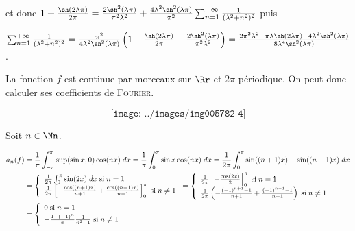 {{et donc $1+\frac{\sh(2\lambda\pi)}{2\pi}=\frac{2\sh^2(\lambda\pi)}{\pi^2\lambda^2}+\frac{4\lambda^2\sh^2(\lambda\pi)}{\pi^2}\sum_{n=1}^{+\infty}\frac{1}{(\lambda^2+n^2)^2}$ puis

\begin{center}
$\sum_{n=1}^{+\infty}\frac{1}{(\lambda^2+n^2)^2}=\frac{\pi^2}{4\lambda^2\sh^2(\lambda\pi)}\left(1+\frac{\sh(2\lambda\pi)}{2\pi}-\frac{2\sh^2(\lambda\pi)}{\pi^2\lambda^2}\right)=\frac{2\pi^2\lambda^2+\pi\lambda\sh(2\lambda\pi)-4\lambda^2\sh^2(\lambda\pi)}{8\lambda^4\sh^2(\lambda\pi)}$.
\end{center}

\begin{center}
\end{center}
La fonction $f$ est continue par morceaux sur $\Rr$ et $2\pi$-périodique. On peut donc calculer ses coefficients de \textsc{Fourier}.

$$\texttt{[image: ../images/img005782-4]}$$


Soit $n\in\Nn$.

\begin{align*}\ensuremath
a_n(f)&=\frac{1}{\pi}\int_{-\pi}^{\pi}\text{sup}(\sin x,0)\cos(nx)\;dx=\frac{1}{\pi}\int_{0}^{\pi}\sin x\cos(nx)\;dx=\frac{1}{2\pi}\int_{0}^{\pi}\sin((n+1)x)-\sin((n-1)x)\;dx\\
 &=\left\{
 \begin{array}{l}
 \frac{1}{2\pi}\int_{0}^{\pi}\sin(2x)\;dx\;\text{si}\;n=1\\
 \frac{1}{2\pi}\left[-\frac{\cos((n+1)x)}{n+1}+\frac{\cos((n-1)x)}{n-1}\right]_0^\pi\;\text{si}\;n\neq1
 \end{array}
 \right.=\left\{
 \begin{array}{l}
 \frac{1}{2\pi}\left[-\frac{\cos(2x)}{2}\right]_0^\pi\;\text{si}\;n=1\\
 \frac{1}{2\pi}\left(-\frac{(-1)^{n+1}-1}{n+1}+\frac{(-1)^{n-1}-1}{n-1}\right)\;\text{si}\;n\neq1
 \end{array}
 \right.\\
 &=\left\{
 \begin{array}{l}
\rule[-2mm]{0mm}{0mm}0\;\text{si}\;n=1\\
-\frac{1+(-1)^n}{\pi}\frac{1}{n^2-1}\;\text{si}\;n\neq1
 \end{array}
 \right.
\end{align*}

}}
